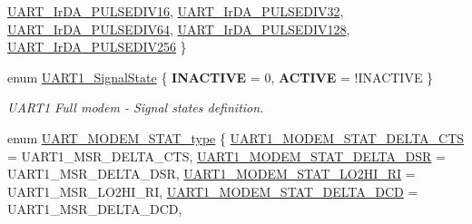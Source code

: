 \begin{DoxyCompactItemize}
\hyperlink{group___u_a_r_t___public___types_gga2e41fe7d668367ce455940f7dfde1d92a9570093dfc702f7d3c3338b90b538d31}{\-U\-A\-R\-T\-\_\-\-Ir\-D\-A\-\_\-\-P\-U\-L\-S\-E\-D\-I\-V16}, 
\*
\hyperlink{group___u_a_r_t___public___types_gga2e41fe7d668367ce455940f7dfde1d92aba3be4c61ed87bf2b393d09fd7dd9381}{\-U\-A\-R\-T\-\_\-\-Ir\-D\-A\-\_\-\-P\-U\-L\-S\-E\-D\-I\-V32}, 
\hyperlink{group___u_a_r_t___public___types_gga2e41fe7d668367ce455940f7dfde1d92aa0deb7fa71b2f633cf22fda359725b61}{\-U\-A\-R\-T\-\_\-\-Ir\-D\-A\-\_\-\-P\-U\-L\-S\-E\-D\-I\-V64}, 
\hyperlink{group___u_a_r_t___public___types_gga2e41fe7d668367ce455940f7dfde1d92ad848bb16f1e1a6761fe8258dd0185cdc}{\-U\-A\-R\-T\-\_\-\-Ir\-D\-A\-\_\-\-P\-U\-L\-S\-E\-D\-I\-V128}, 
\hyperlink{group___u_a_r_t___public___types_gga2e41fe7d668367ce455940f7dfde1d92af4bd935127cbea2dc71b580e3103b976}{\-U\-A\-R\-T\-\_\-\-Ir\-D\-A\-\_\-\-P\-U\-L\-S\-E\-D\-I\-V256}
 \}
\item 
enum \hyperlink{group___u_a_r_t___public___types_gada493f726a4ea247b209b49fb8c85a52}{\-U\-A\-R\-T1\-\_\-\-Signal\-State} \{ {\bfseries \-I\-N\-A\-C\-T\-I\-V\-E} =  0, 
{\bfseries \-A\-C\-T\-I\-V\-E} =  !\-I\-N\-A\-C\-T\-I\-V\-E
 \}
\begin{DoxyCompactList}\small\item\em \-U\-A\-R\-T1 \-Full modem -\/ \-Signal states definition. \end{DoxyCompactList}\item 
enum \hyperlink{group___u_a_r_t___public___types_ga2f7d223e1fdf6018ff08109bb1c976ef}{\-U\-A\-R\-T\-\_\-\-M\-O\-D\-E\-M\-\_\-\-S\-T\-A\-T\-\_\-type} \{ \*
\hyperlink{group___u_a_r_t___public___types_gga2f7d223e1fdf6018ff08109bb1c976efa14569e119fbc9aecec4d75274a21d236}{\-U\-A\-R\-T1\-\_\-\-M\-O\-D\-E\-M\-\_\-\-S\-T\-A\-T\-\_\-\-D\-E\-L\-T\-A\-\_\-\-C\-T\-S} =  \-U\-A\-R\-T1\-\_\-\-M\-S\-R\-\_\-\-D\-E\-L\-T\-A\-\_\-\-C\-T\-S, 
\hyperlink{group___u_a_r_t___public___types_gga2f7d223e1fdf6018ff08109bb1c976efa3e99dc6a7d3fe3c5d137d94f7e678868}{\-U\-A\-R\-T1\-\_\-\-M\-O\-D\-E\-M\-\_\-\-S\-T\-A\-T\-\_\-\-D\-E\-L\-T\-A\-\_\-\-D\-S\-R} =  \-U\-A\-R\-T1\-\_\-\-M\-S\-R\-\_\-\-D\-E\-L\-T\-A\-\_\-\-D\-S\-R, 
\hyperlink{group___u_a_r_t___public___types_gga2f7d223e1fdf6018ff08109bb1c976efa3ae42ef0d6c29324104dcfffeff199f1}{\-U\-A\-R\-T1\-\_\-\-M\-O\-D\-E\-M\-\_\-\-S\-T\-A\-T\-\_\-\-L\-O2\-H\-I\-\_\-\-R\-I} =  \-U\-A\-R\-T1\-\_\-\-M\-S\-R\-\_\-\-L\-O2\-H\-I\-\_\-\-R\-I, 
\hyperlink{group___u_a_r_t___public___types_gga2f7d223e1fdf6018ff08109bb1c976efa96fa592faed2ab9230d8c7b598d7ee8c}{\-U\-A\-R\-T1\-\_\-\-M\-O\-D\-E\-M\-\_\-\-S\-T\-A\-T\-\_\-\-D\-E\-L\-T\-A\-\_\-\-D\-C\-D} =  \-U\-A\-R\-T1\-\_\-\-M\-S\-R\-\_\-\-D\-E\-L\-T\-A\-\_\-\-D\-C\-D, 

\end{DoxyCompactItemize}
